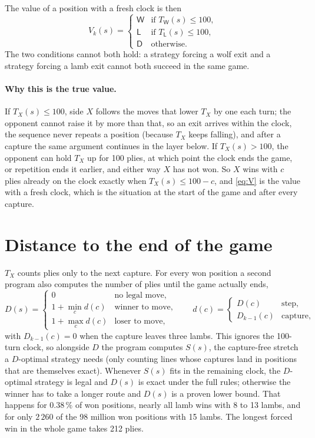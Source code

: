 \documentclass[11pt,a4paper]{article}
\newcommand{\W}{\mathsf{W}}
\newcommand{\Lb}{\mathsf{L}}
\newcommand{\D}{\mathsf{D}}
\begin{document}
The value of a position with a fresh clock is then
\begin{equation}\label{eq:V}
V_k(s)=
\begin{cases}
\W & \text{if } T_{\W}(s)\le 100,\\
\Lb & \text{if } T_{\Lb}(s)\le 100,\\
\D & \text{otherwise.}
\end{cases}
\end{equation}
The two conditions cannot both hold: a strategy forcing a wolf exit and a strategy
forcing a lamb exit cannot both succeed in the same game.

\paragraph{Why this is the true value.}
If $T_X(s)\le 100$, side $X$ follows the moves that lower $T_X$ by one each turn;
the opponent cannot raise it by more than that, so an exit arrives within the
clock, the sequence never repeats a position (because $T_X$ keeps falling), and
after a capture the same argument continues in the layer below. If
$T_X(s)>100$, the opponent can hold $T_X$ up for 100 plies, at which point the
clock ends the game, or repetition ends it earlier, and either way $X$ has not
won. So $X$ wins with $c$ plies already on the clock exactly when
$T_X(s)\le 100-c$, and \eqref{eq:V} is the value with a fresh clock, which is the
situation at the start of the game and after every capture.

\section*{Distance to the end of the game}

$T_X$ counts plies only to the next capture. For every won position a second
program also computes the number of plies until the game actually ends,
\[
D(s)=\begin{cases}
0 & \text{no legal move},\\
1+\min_c d(c) & \text{winner to move},\\
1+\max_c d(c) & \text{loser to move},
\end{cases}
\qquad
d(c)=\begin{cases} D(c) & \text{step},\\ D_{k-1}(c) & \text{capture},\end{cases}
\]
with $D_{k-1}(c)=0$ when the capture leaves three lambs. This ignores the
100-turn clock, so alongside $D$ the program computes $S(s)$, the capture-free
stretch a $D$-optimal strategy needs (only counting lines whose captures land in
positions that are themselves exact). Whenever $S(s)$ fits in the remaining
clock, the $D$-optimal strategy is legal and $D(s)$ is exact under the full
rules; otherwise the winner has to take a longer route and $D(s)$ is a proven
lower bound. That happens for $0.38\,\%$ of won positions, nearly all lamb wins
with 8 to 13 lambs, and for only $2\,260$ of the 98 million won positions with
15 lambs. The longest forced win in the whole game takes 212 plies.
\end{document}
